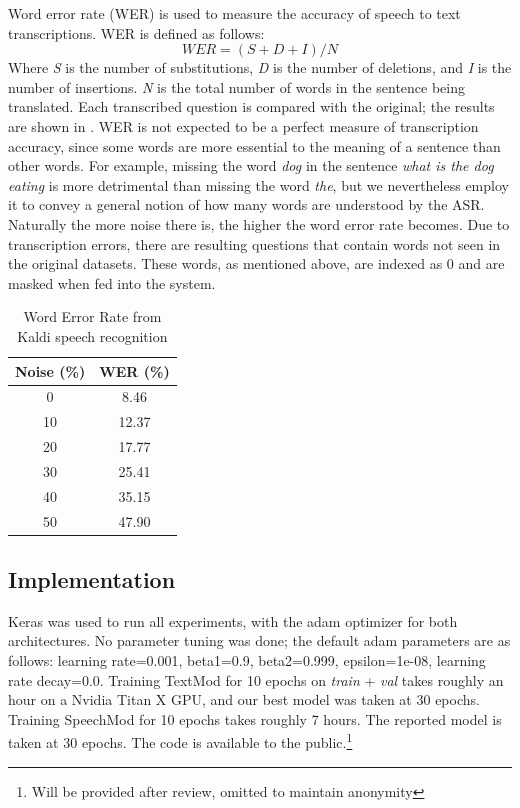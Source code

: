 \documentclass[letterpaper]{article} %
\begin{document}
Word error rate (WER) is used to measure the accuracy of speech to text transcriptions. WER is defined as follows: 
\begin{displaymath}
  \mathit{WER} = (S+D+I)/N
\end{displaymath}
Where \textit{S} is the number of substitutions, \textit{D} is the number of deletions, and \textit{I} is the number of insertions. \textit{N} is the total number of words in the sentence being translated. Each transcribed question is compared with the original; the results are shown in . WER is not expected to be a perfect measure of transcription accuracy, since some words are more essential to the meaning of a sentence than other words. For example, missing the word \emph{dog} in the sentence \emph{what is the dog eating} is more detrimental than missing the word \emph{the}, but we nevertheless employ it to convey a general notion of how many words are understood by the ASR. Naturally the more noise there is, the higher the word error rate becomes. Due to transcription errors, there are resulting questions that contain words not seen in the original datasets. These words, as mentioned above, are indexed as 0 and are masked when fed into the system.


\begin{table}[t]
\centering
\caption{Word Error Rate from Kaldi speech recognition}
\label{table:wer}
\begin{tabular}{c|c}
Noise (\%)   & WER (\%) \\ \hline
0  & 8.46  \\
10 & 12.37 \\
20 & 17.77 \\
30 & 25.41 \\
40 & 35.15 \\
50 & 47.90
\end{tabular}
\end{table}

\subsection{Implementation}
Keras was used to run all experiments, with the adam optimizer for both architectures. No parameter tuning was done; the default adam parameters are as follows: learning rate=0.001, beta1=0.9, beta2=0.999, epsilon=1e-08, learning  rate decay=0.0. Training TextMod for 10 epochs on \textit{train} + \textit{val} takes roughly an hour on a Nvidia Titan X GPU, and our best model was taken at 30 epochs. Training SpeechMod for 10 epochs takes roughly 7 hours. The reported model is taken at 30 epochs. The code is available to the public.\footnote{Will be provided after review, omitted to maintain anonymity}
\end{document}
